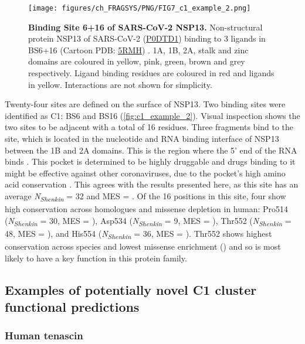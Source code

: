 {\begin{figure}[htb!]
    \centering
    \texttt{[image: figures/ch\_FRAGSYS/PNG/FIG7\_c1\_example\_2.png]}
    \caption[Binding Site 6+16 of SARS-CoV-2 NSP13]{\textbf{Binding Site 6+16 of SARS-CoV-2 NSP13.} Non-structural protein NSP13 of SARS-CoV-2 (\href{https://www.uniprot.org/uniprotkb/P0DTD1/entry}{P0DTD1}) binding to 3 ligands in BS6+16 (Cartoon PDB: \href{https://www.ebi.ac.uk/pdbe/entry/pdb/5RMH}{5RMH}) \cite{NEWMAN_2021_SARSCOV2}. 1A, 1B, 2A, stalk and zinc domains are coloured in yellow, pink, green, brown and grey respectively. Ligand binding residues are coloured in red and ligands in yellow. Interactions are not shown for simplicity.}
    \label{fig:c1_example_2}
\end{figure}

Twenty-four sites are defined on the surface of NSP13. Two binding sites were identified as C1: BS6 and BS16 (\autoref{fig:c1_example_2}). Visual inspection shows the two sites to be adjacent with a total of 16 residues. Three fragments bind to the site, which is located in the nucleotide and RNA binding interface of NSP13 between the 1B and 2A domains. This is the region where the 5’ end of the RNA binds \cite{YAN_2020_SARSCOV2}. This pocket is determined to be highly druggable and drugs binding to it might be effective against other coronaviruses, due to the pocket's high amino acid conservation \cite{NEWMAN_2021_SARSCOV2}. This agrees with the results presented here, as this site has an average \textit{N\textsubscript{Shenkin}} = 32 and MES = . Of the 16 positions in this site, four show high conservation across homologues and missense depletion in human: Pro514 (\textit{N\textsubscript{Shenkin}} = 30, MES = ), Asp534 (\textit{N\textsubscript{Shenkin}} = 9, MES = ), Thr552 (\textit{N\textsubscript{Shenkin}} = 48, MES = ), and His554 (\textit{N\textsubscript{Shenkin}} = 36, MES = ). Thr552 shows highest conservation across species and lowest missense enrichment () and so is most likely to have a key function in this protein family.

\subsection{Examples of potentially novel C1 cluster functional predictions}

\subsubsection{Human tenascin}

}
